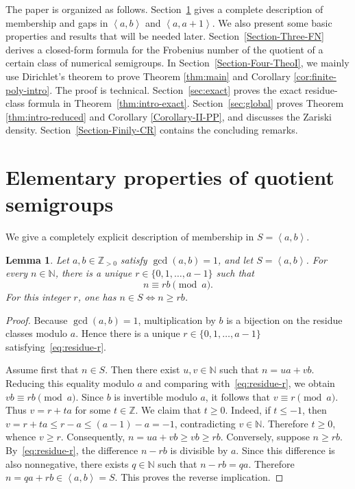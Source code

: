 \documentclass[reqno, 12pt]{article}
\numberwithin{equation}{section}
\newtheorem{lemma}[theorem]{Lemma}
\theoremstyle{definition}
\newcommand{\NN}{\mathbb{N}}
\newcommand{\ZZ}{\mathbb{Z}}
\newcommand{\gen}[1]{\left\langle #1\right\rangle}
\begin{document}
The paper is organized as follows. Section~\ref{Section-Two-Elementary} gives a complete description of membership and
gaps in $\gen{a,b}$ and $\gen{a,a+1}$. We also present some basic properties and results that will be needed later.
Section~\ref{Section-Three-FN} derives a closed-form formula for the Frobenius number of the quotient of a certain class of numerical semigroups.
In Section~\ref{Section-Four-TheoI}, we mainly use Dirichlet's theorem to prove Theorem \ref{thm:main} and Corollary \ref{cor:finite-poly-intro}. The proof is technical.
Section~\ref{sec:exact} proves the exact residue-class formula in Theorem~\ref{thm:intro-exact}.
Section~\ref{sec:global} proves Theorem \ref{thm:intro-reduced} and Corollary \ref{Corollary-II-PP}, and discusses the Zariski density. Section~\ref{Section-Finily-CR} contains the concluding remarks.


\section{Elementary properties of quotient semigroups}\label{Section-Two-Elementary}

We give a completely explicit description of membership in $S=\gen{a,b}$.

\begin{lemma}\label{lem:membership2}
Let $a,b\in\ZZ_{>0}$ satisfy $\gcd(a,b)=1$, and let $S=\gen{a,b}$.  For every $n\in\NN$, there is a unique $r\in\{0,1,\ldots,a-1\}$ such that
\begin{equation}\label{eq:residue-r}
  n\equiv rb\pmod a.
\end{equation}
For this integer $r$, one has $n\in S \Longleftrightarrow n\ge rb$.
\end{lemma}
\begin{proof}
Because $\gcd(a,b)=1$, multiplication by $b$ is a bijection on the residue
classes modulo $a$.  Hence there is a unique
$r\in\{0,1,\ldots,a-1\}$ satisfying~\cref{eq:residue-r}.

Assume first that $n\in S$.  Then there exist $u,v\in\NN$ such that $n=ua+vb$.
Reducing this equality modulo $a$ and comparing with~\cref{eq:residue-r},
we obtain $vb\equiv rb\pmod a$.
Since $b$ is invertible modulo $a$, it follows that $v\equiv r\pmod a$.
Thus $v=r+ta$ for some $t\in\ZZ$. We claim that $t\ge0$. Indeed, if $t\le-1$, then $v=r+ta\le r-a\le(a-1)-a=-1$,
contradicting $v\in\NN$.  Therefore $t\ge0$, whence $v\ge r$.  Consequently, $n=ua+vb\ge vb\ge rb$.
Conversely, suppose $n\ge rb$.  By~\cref{eq:residue-r}, the difference $n-rb$ is divisible by $a$.  Since this difference is also nonnegative, there exists $q\in\NN$ such that $n-rb=qa$.
Therefore $n=qa+rb\in\gen{a,b}=S$. This proves the reverse implication.
\end{proof}
\end{document}
